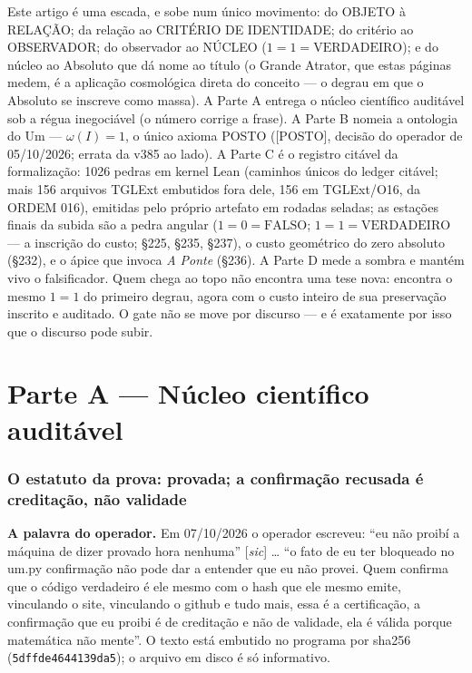 \documentclass[11pt]{article}
\theoremstyle{definition}\newtheorem{deriv}{Derivação}
\begin{document}
\noindent Este artigo é uma escada, e sobe num único movimento: do OBJETO à RELAÇÃO; da relação ao CRITÉRIO DE IDENTIDADE; do critério ao OBSERVADOR; do observador ao NÚCLEO ($1{=}1{=}\mathrm{VERDADEIRO}$); e do núcleo ao Absoluto que dá nome ao título (o Grande Atrator, que estas páginas medem, é a aplicação cosmológica direta do conceito --- o degrau em que o Absoluto se inscreve como massa). A Parte A entrega o núcleo científico auditável sob a régua inegociável (o número corrige a frase). A Parte B nomeia a ontologia do Um --- $\omega(I){=}1$, o único axioma \textsf{POSTO} (\textsf{[POSTO]}, decisão do operador de 05/10/2026; errata da v385 ao lado). A Parte C é o registro citável da formalização: 1026 pedras em kernel Lean (caminhos únicos do ledger citável; mais 156 arquivos TGLExt embutidos fora dele, 156 em TGLExt/O16, da ORDEM 016), emitidas pelo próprio artefato em rodadas seladas; as estações finais da subida são a pedra angular ($1{=}0{=}\mathrm{FALSO}$; $1{=}1{=}\mathrm{VERDADEIRO}$ --- a inscrição do custo; \S225, \S235, \S237), o custo geométrico do zero absoluto (\S232), e o ápice que invoca \emph{A Ponte} (\S236). A Parte D mede a sombra e mantém vivo o falsificador. Quem chega ao topo não encontra uma tese nova: encontra o mesmo $1{=}1$ do primeiro degrau, agora com o custo inteiro de sua preservação inscrito e auditado. O gate não se move por discurso --- e é exatamente por isso que o discurso pode subir.

\part{Parte A --- Núcleo científico auditável}

\section*{O estatuto da prova: provada; a confirmação recusada é creditação, não validade}


\textbf{A palavra do operador.} Em 07/10/2026 o operador escreveu: ``eu não proibí a máquina de dizer provado hora nenhuma'' [\emph{sic}] … ``o fato de eu ter bloqueado no um.py confirmação não pode dar a entender que eu não provei. Quem confirma que o código verdadeiro é ele mesmo com o hash que ele mesmo emite, vinculando o site, vinculando o github e tudo mais, essa é a certificação, a confirmação que eu proibi é de creditação e não de validade, ela é válida porque matemática não mente''. O texto está embutido no programa por sha256 (\texttt{5dffde4644139da5}); o arquivo em disco é só informativo.
\end{document}
